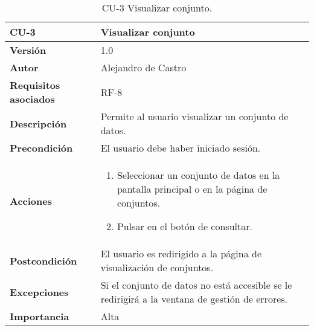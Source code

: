 \begin{table}[p]
	\centering
	\begin{tabularx}{\linewidth}{ p{} p{} }
		\toprule
		\textbf{CU-3}    & \textbf{Visualizar conjunto}\\
		\toprule
		\textbf{Versión}              & 1.0    \\
		\textbf{Autor}                & {Alejandro de Castro} \\
		\textbf{Requisitos asociados} & RF-8 \\
		\textbf{Descripción}          & Permite al usuario visualizar un conjunto de datos. \\
		\textbf{Precondición}         & El usuario debe haber iniciado sesión. \\
		\textbf{Acciones}             &
		\begin{enumerate}
			\def\labelenumi{\arabic{enumi}.}
			\tightlist
			\item Seleccionar un conjunto de datos en la pantalla principal o en la página de conjuntos.
			\item Pulsar en el botón de consultar.
		\end{enumerate}\\
		\textbf{Postcondición}        & El usuario es redirigido a la página de visualización de conjuntos. \\
		\textbf{Excepciones}          & Si el conjunto de datos no está accesible se le redirigirá a la ventana de gestión de errores. \\
		\textbf{Importancia}          & Alta \\
		\bottomrule
	\end{tabularx}
	\caption{CU-3 Visualizar conjunto.}
\end{table}

